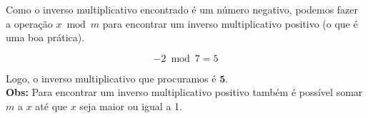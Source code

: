 Como o inverso multiplicativo encontrado é um número negativo, podemos fazer a operação $x \bmod m$ para encontrar um inverso multiplicativo positivo (o que é uma boa prática).

\[
    -2 \bmod 7 = 5
\]

Logo, o inverso multiplicativo que procuramos é $\mathbf{5}$.\\

\textbf{Obs:} Para encontrar um inverso multiplicativo positivo também é possível somar $m$ a $x$ até que $x$ seja maior ou igual a 1.